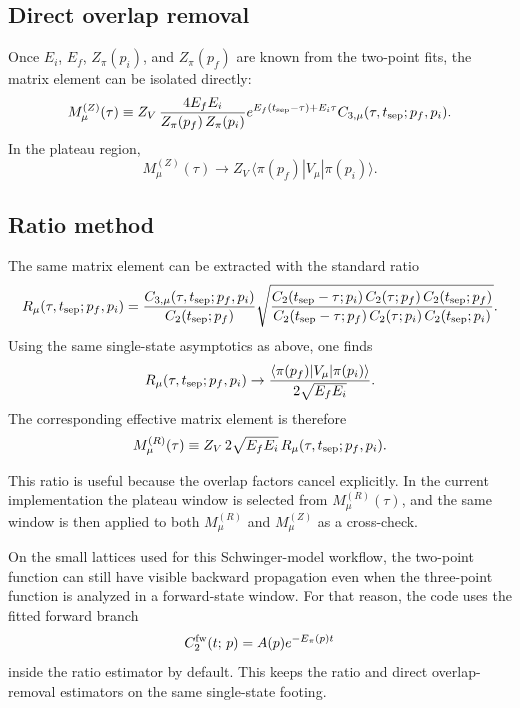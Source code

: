 \documentclass[11pt]{article}
\begin{document}
\subsection{Direct overlap removal}
Once $E_i$, $E_f$, $Z_\pi(p_i)$, and $Z_\pi(p_f)$ are known from the two-point
fits, the matrix element can be isolated directly:
\begin{equation}
  M_\mu^{(Z)}(\tau)
  \equiv
  Z_V\,
  \frac{4E_fE_i}{Z_\pi(p_f)\,Z_\pi(p_i)}
  e^{E_f(t_{\rm sep}-\tau)+E_i\tau}
  C_{3,\mu}(\tau,t_{\rm sep};p_f,p_i).
\end{equation}
In the plateau region,
\begin{equation}
  M_\mu^{(Z)}(\tau)
  \to
  Z_V\,\langle \pi(p_f)|V_\mu|\pi(p_i)\rangle.
\end{equation}

\subsection{Ratio method}
The same matrix element can be extracted with the standard ratio
\begin{equation}
  R_\mu(\tau,t_{\rm sep};p_f,p_i)
  =
  \frac{C_{3,\mu}(\tau,t_{\rm sep};p_f,p_i)}{C_2(t_{\rm sep};p_f)}
  \sqrt{
    \frac{
      C_2(t_{\rm sep}-\tau;p_i)\,
      C_2(\tau;p_f)\,
      C_2(t_{\rm sep};p_f)
    }{
      C_2(t_{\rm sep}-\tau;p_f)\,
      C_2(\tau;p_i)\,
      C_2(t_{\rm sep};p_i)
    }
  }.
\end{equation}
Using the same single-state asymptotics as above, one finds
\begin{equation}
  R_\mu(\tau,t_{\rm sep};p_f,p_i)
  \to
  \frac{
    \langle \pi(p_f)|V_\mu|\pi(p_i)\rangle
  }{
    2\sqrt{E_fE_i}
  }.
\end{equation}
The corresponding effective matrix element is therefore
\begin{equation}
  M_\mu^{(R)}(\tau)
  \equiv
  Z_V\,2\sqrt{E_fE_i}\,
  R_\mu(\tau,t_{\rm sep};p_f,p_i).
\end{equation}

This ratio is useful because the overlap factors cancel explicitly. In the
current implementation the plateau window is selected from $M_\mu^{(R)}(\tau)$,
and the same window is then applied to both $M_\mu^{(R)}$ and $M_\mu^{(Z)}$ as
a cross-check.

On the small lattices used for this Schwinger-model workflow, the two-point
function can still have visible backward propagation even when the three-point
function is analyzed in a forward-state window. For that reason, the code uses
the fitted forward branch
\begin{equation}
  C_2^{\rm fw}(t;\,p) = A(p)e^{-E_\pi(p)t}
\end{equation}
inside the ratio estimator by default. This keeps the ratio and direct
overlap-removal estimators on the same single-state footing.
\end{document}
